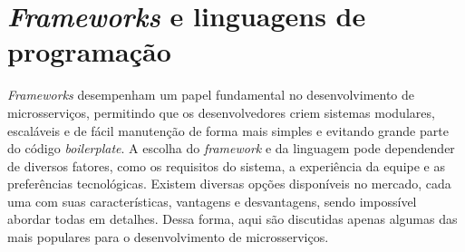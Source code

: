




\section{\emph{Frameworks} e linguagens de programação}

\emph{Frameworks} desempenham um papel fundamental no desenvolvimento de microsserviços, permitindo que os desenvolvedores criem sistemas modulares, escaláveis e de fácil manutenção de forma mais simples e evitando grande parte do código \emph{boilerplate}. A escolha do \emph{framework} e da linguagem pode dependender de diversos fatores, como os requisitos do sistema, a experiência da equipe e as preferências tecnológicas. Existem diversas opções disponíveis no mercado, cada uma com suas características, vantagens e desvantagens, sendo impossível abordar todas em detalhes. Dessa forma, aqui são discutidas apenas algumas das mais populares para o desenvolvimento de microsserviços.


